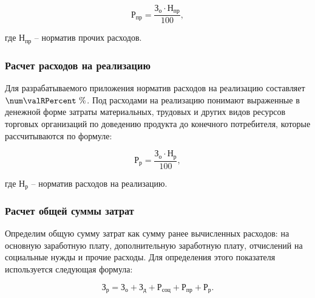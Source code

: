 \begin{equation}
  \label{eq:econ:RPr}
  \text{Р}_\text{пр} = \frac{\text{З}_\text{о} \cdot \text{Н}_\text{пр}}
    {100},
\end{equation}
\begin{explanationx}
  \item[где] $ \text{Н}_\text{пр} $ -- норматив прочих расходов.
\end{explanationx}


\subsubsection{Расчет расходов на реализацию}


Для разрабатываемого приложения норматив расходов на реализацию составляет $ \num\valRPercent \ \% $. Под расходами на реализацию понимают выраженные в денежной форме затраты материальных, трудовых и других видов ресурсов торговых организаций по доведению продукта до конечного потребителя, которые рассчитываются по формуле:

\begin{equation}
  \label{eq:econ:R}
  \text{Р}_\text{р} = \frac{\text{З}_\text{о} \cdot \text{Н}_\text{р}}
    {100},
\end{equation}
\begin{explanationx}
  \item[где] $ \text{Н}_\text{р} $ -- норматив расходов на реализацию.
\end{explanationx}


\subsubsection{Расчет общей суммы затрат}

Определим общую сумму затрат как сумму ранее вычисленных расходов: на основную
заработную плату, дополнительную заработную плату, отчислений на социальные нужды и
прочие расходы. Для определения этого показателя используется следующая формула:

\begin{equation}
  \label{eq:econ:Zr}
  \text{З}_\text{р} = \text{З}_\text{о} + \text{З}_\text{д}
    + \text{Р}_\text{соц} + \text{Р}_\text{пр} + \text{Р}_\text{р}.
\end{equation}

